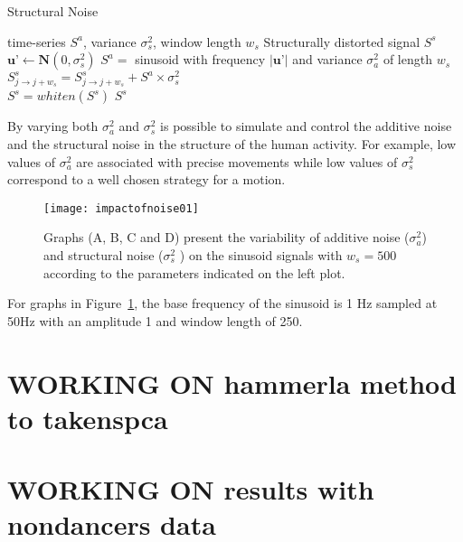 \documentclass[10pt,journal,compsoc]{IEEEtran}
\begin{document}
\begin{algorithm}[H]
\caption{Structural Noise}
\begin{algorithmic}[1]
 \renewcommand{\algorithmicrequire}{\textbf{Input:}}
 \renewcommand{\algorithmicensure}{\textbf{Output:}}
 \REQUIRE time-series $S^a$, variance $\sigma_s ^2$, window length $w_s$
 \ENSURE  Structurally distorted signal $S^s$
  \STATE $\textbf{u'} \leftarrow \textbf{N}(0, \sigma_s ^2)$
  \STATE $S^{a} =$ sinusoid with frequency $| \textbf{u'} |$ and variance $\sigma_a ^2$ of length $w_s$
  \STATE $S^s_{j \rightarrow j+w_s}  = S^s_{j \rightarrow j+w_s}  + S^{a} \times   \sigma_s ^2 $
  \ENDFOR
  \\ $S^s= whiten (S^s)$
 \RETURN $S^s$
\end{algorithmic}
\end{algorithm}

By varying both $\sigma_a ^2$ and $\sigma_s ^2$ 
is possible to simulate and control the additive noise and the structural noise 
in the structure of the human activity. For example, low values of $\sigma_a ^2$ 
are associated with precise movements while low values of $\sigma_s ^2$ correspond 
to a well chosen strategy for a motion.


\begin{figure}[!htb]
\centering    
 \texttt{[image: impactofnoise01]}
\caption[PA]{Graphs (A, B, C and D) present the variability of additive noise 
($\sigma_a ^2$) and structural noise ($\sigma_s ^2$ ) on the sinusoid signals with $w_s=500$ 
according to the parameters indicated on the left plot.}
\label{fig:sn}
\end{figure}

For graphs in Figure~\ref{fig:sn}, the base frequency of the sinusoid is 1 Hz sampled at 50Hz with an 
amplitude 1 and window length of 250.





\section{WORKING ON hammerla method to takenspca}
\section{WORKING ON results with nondancers data}
\end{document}
